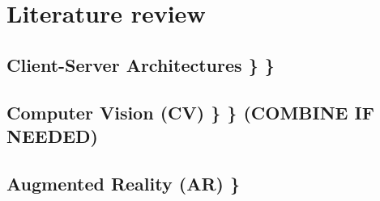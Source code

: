 \chapter{Literature review} \label{Literature review}

\section{Client-Server Architectures    \}    \}} \label{csa}

\section{Computer Vision (CV)           \}    \}    (COMBINE IF NEEDED)} \label{cv}

\section{Augmented Reality (AR)               \}} \label{ar}

